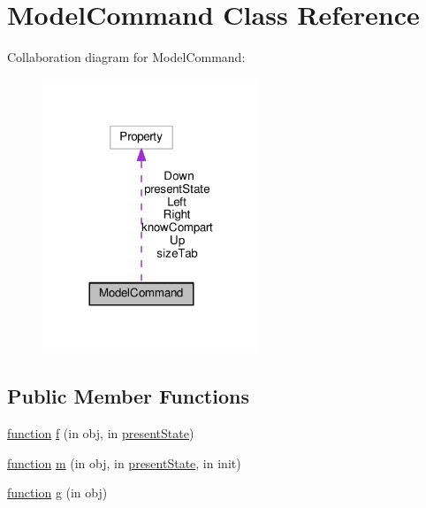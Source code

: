 \hypertarget{class_model_command}{}\section{Model\+Command Class Reference}
\label{class_model_command}


Collaboration diagram for Model\+Command\+:\nopagebreak
\begin{figure}[H]
\begin{center}
\leavevmode
\includegraphics[width=185pt]{class_model_command__coll__graph}
\end{center}
\end{figure}
\subsection*{Public Member Functions}
\begin{DoxyCompactItemize}
\item 
\hyperlink{_plan__desuma_functions__2_players_8m_ac2ffb26d6f42d3bbcd7847b0873403f4}{function} \hyperlink{class_model_command_ad9bed4bf30a168ad0154e2a4bc93f580}{f} (in obj, in \hyperlink{class_model_command_a9624cc7c421a50fa5086b0ebd0cd5fe3}{present\+State})
\item 
\hyperlink{_plan__desuma_functions__2_players_8m_ac2ffb26d6f42d3bbcd7847b0873403f4}{function} \hyperlink{class_model_command_accd2878e039165d11e1c6ff627011a8f}{m} (in obj, in \hyperlink{class_model_command_a9624cc7c421a50fa5086b0ebd0cd5fe3}{present\+State}, in init)
\item 
\hyperlink{_plan__desuma_functions__2_players_8m_ac2ffb26d6f42d3bbcd7847b0873403f4}{function} \hyperlink{class_model_command_a07dadfabe92bf9a144b8a862720e7746}{g} (in obj)
\end{DoxyCompactItemize}
